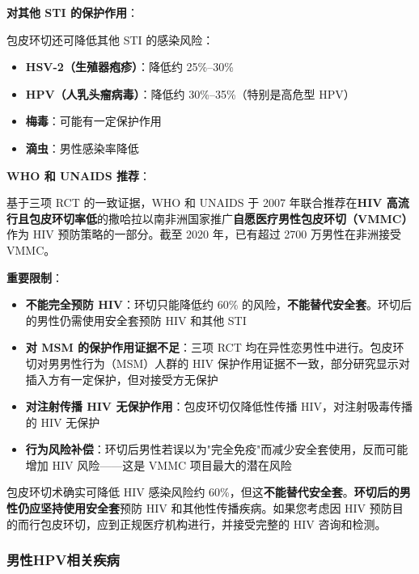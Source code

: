 \vspace{0.5em}
\noindent\textbf{对其他 STI 的保护作用}：

包皮环切还可降低其他 STI 的感染风险：
\begin{itemize}[leftmargin=2cm]
	\item \textbf{HSV-2（生殖器疱疹）}：降低约 25\%--30\%
	\item \textbf{HPV（人乳头瘤病毒）}：降低约 30\%--35\%（特别是高危型 HPV）
	\item \textbf{梅毒}：可能有一定保护作用
	\item \textbf{滴虫}：男性感染率降低
\end{itemize}

\vspace{0.5em}
\noindent\textbf{WHO 和 UNAIDS 推荐}：

基于三项 RCT 的一致证据，WHO 和 UNAIDS 于 2007 年联合推荐在\textbf{HIV 高流行且包皮环切率低}的撒哈拉以南非洲国家推广\textbf{自愿医疗男性包皮环切（VMMC）}作为 HIV 预防策略的一部分。截至 2020 年，已有超过 2700 万男性在非洲接受 VMMC。

\vspace{0.5em}
\noindent\textbf{重要限制}：

\begin{itemize}[leftmargin=2cm]
	\item \textbf{不能完全预防 HIV}：环切只能降低约 60\% 的风险，\textbf{不能替代安全套}。环切后的男性仍需使用安全套预防 HIV 和其他 STI
	\item \textbf{对 MSM 的保护作用证据不足}：三项 RCT 均在异性恋男性中进行。包皮环切对男男性行为（MSM）人群的 HIV 保护作用证据不一致，部分研究显示对插入方有一定保护，但对接受方无保护
	\item \textbf{对注射传播 HIV 无保护作用}：包皮环切仅降低性传播 HIV，对注射吸毒传播的 HIV 无保护
	\item \textbf{行为风险补偿}：环切后男性若误以为"完全免疫"而减少安全套使用，反而可能增加 HIV 风险——这是 VMMC 项目最大的潜在风险
\end{itemize}

\begin{tcolorbox}[colback=pink!5!white,colframe=red!50!black,title=贴心小叮咛]
包皮环切术确实可降低 HIV 感染风险约 60\%，但这\textbf{不能替代安全套}。\textbf{环切后的男性仍应坚持使用安全套}预防 HIV 和其他性传播疾病。如果您考虑因 HIV 预防目的而行包皮环切，应到正规医疗机构进行，并接受完整的 HIV 咨询和检测。
\end{tcolorbox}

\subsubsection{男性HPV相关疾病}
\label{subsec:male_hpv}

